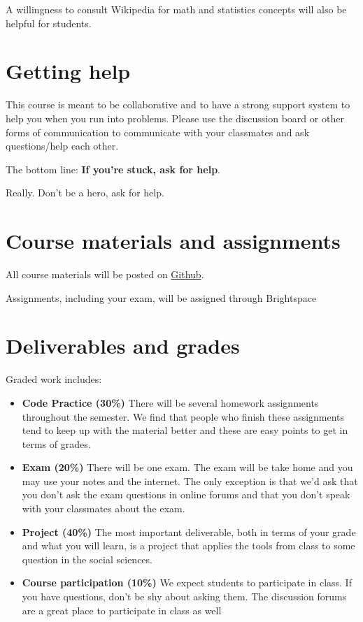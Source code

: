 \documentclass[12pt,pdftex,twoside,letterpaper]{exam}
\begin{document}
    A willingness to consult Wikipedia for math and statistics concepts will also be helpful for
    students.

  \section*{Getting help}

    This course is meant to be collaborative and to have a strong support system to help you when
    you run into problems. Please use the discussion board or other forms of communication to
    communicate with your classmates and ask questions/help each other.

    The bottom line:  {\bf If you're stuck, ask for help\/}.

    Really.  Don't be a hero, ask for help.

  \section*{Course materials and assignments}

    All course materials will be posted on \href{https://github.com/NYU-ComputationalSocialScience/ECON-GA-4004-S2023}{Github}.

    Assignments, including your exam, will be assigned through Brightspace

  \section*{Deliverables and grades}

    Graded work includes:

    \begin{itemize}
      \item {\bf Code Practice (30\%)} There will be several homework assignments throughout the
            semester. We find that people who finish these assignments tend to keep up
            with the material better and these are easy points to get in terms of grades.
      \item {\bf Exam (20\%)} There will be one exam. The exam will be take home and you may use
            your notes and the internet. The only exception is that we'd ask that you don't ask
            the exam questions in online forums and that you don't speak with your classmates about
            the exam.
      \item {\bf Project (40\%)} The most important deliverable, both in terms of your grade and
            what you will learn, is a project that applies the tools from class to some question
            in the social sciences.
      \item {\bf Course participation (10\%)} We expect students to participate in class. If you have
            questions, don't be shy about asking them. The discussion forums are a great place to
            participate in class as well
    \end{itemize}
\end{document}
